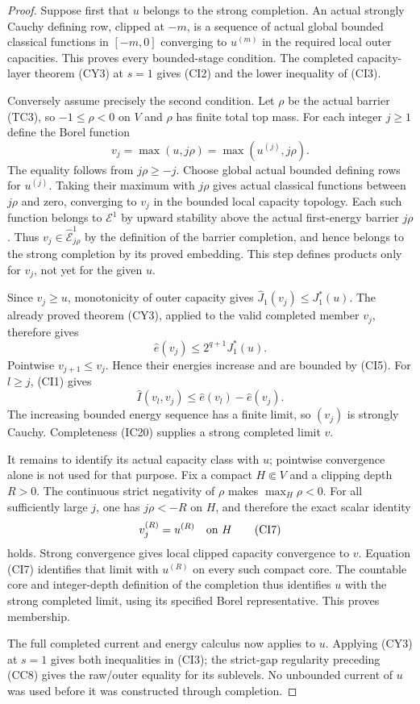 \begin{proof}
Suppose first that $u$ belongs to the strong completion.
An actual strongly Cauchy defining row, clipped at $-m$,
is a sequence of actual global bounded classical functions
in $[-m,0]$ converging to $u^{(m)}$ in the required local
outer capacities. This proves every bounded-stage condition.
The completed capacity-layer theorem (CY3) at $s=1$ gives
(CI2) and the lower inequality of (CI3).

Conversely assume precisely the second condition. Let $\rho$
be the actual barrier (TC3), so $-1\leq\rho<0$ on $V$ and
$\rho$ has finite total top mass. For each integer $j\geq1$
define the Borel function
\[
                     v_j=\max(u,j\rho)
                         =\max(u^{(j)},j\rho).
 \tag{CI4}
\]
The equality follows from $j\rho\geq-j$.
Choose global actual bounded defining rows for $u^{(j)}$.
Taking their maximum with $j\rho$ gives actual classical
functions between $j\rho$ and zero, converging to $v_j$
in the bounded local capacity topology. Each such function
belongs to $\mathcal E^1$ by upward stability above the
actual first-energy barrier $j\rho$. Thus
$v_j\in\widehat{\mathcal E}^1_{j\rho}$ by the definition
of the barrier completion, and hence belongs to the strong
completion by its proved embedding. This step defines
products only for $v_j$, not yet for the given $u$.

Since $v_j\geq u$, monotonicity of outer capacity gives
$\widehat J_1(v_j)\leq J_1^*(u)$.
The already proved theorem (CY3), applied to the valid
completed member $v_j$, therefore gives
\[
                    \widehat e(v_j)\leq2^{q+1}J_1^*(u).
 \tag{CI5}
\]
Pointwise $v_{j+1}\leq v_j$. Hence their energies increase
and are bounded by (CI5). For $l\geq j$, (CI1) gives
\[
                  \widehat I(v_l,v_j)
                           \leq\widehat e(v_l)-\widehat e(v_j).
 \tag{CI6}
\]
The increasing bounded energy sequence has a finite limit,
so $(v_j)$ is strongly Cauchy. Completeness (IC20) supplies
a strong completed limit $v$.

It remains to identify its actual capacity class with $u$;
pointwise convergence alone is not used for that purpose.
Fix a compact $H\Subset V$ and a clipping depth $R>0$.
The continuous strict negativity of $\rho$ makes
$\max_H\rho<0$. For all sufficiently large $j$, one has
$j\rho<-R$ on $H$, and therefore the exact scalar identity
\[
                              v_j^{(R)}=u^{(R)}
                                      \quad\hbox{on }H
 \tag{CI7}
\]
holds. Strong convergence gives local clipped capacity
convergence to $v$. Equation (CI7) identifies that limit
with $u^{(R)}$ on every such compact core. The countable
core and integer-depth definition of the completion thus
identifies $u$ with the strong completed limit, using its
specified Borel representative. This proves membership.

The full completed current and energy calculus now applies
to $u$. Applying (CY3) at $s=1$ gives both inequalities in
(CI3); the strict-gap regularity preceding (CC8) gives the
raw/outer equality for its sublevels. No unbounded current
of $u$ was used before it was constructed through completion.
\end{proof}

